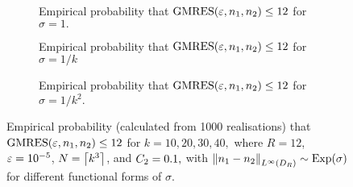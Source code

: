 


\begin{figure}[p]
  \centering
  \begin{subfigure}{\textwidth}
    \centering

\caption{Empirical probability that $\GMRES{\eps}{\no}{\nt}\leq 12$ for $\sigma = 1.$\label{fig:prob-plot-0.0}}
\end{subfigure}

\begin{subfigure}{\textwidth}
    \centering

\caption{Empirical probability that $\GMRES{\eps}{\no}{\nt}\leq 12$ for $\sigma = 1/k$\label{fig:prob-plot-1.0}}
\end{subfigure}

\begin{subfigure}{\textwidth}
    \centering

\caption{Empirical probability that $\GMRES{\eps}{\no}{\nt}\leq 12$ for $\sigma = 1/k^2.$\label{fig:prob-plot-2.0}}
\end{subfigure}
\caption{Empirical probability (calculated from 1000 realisations) that $\GMRES{\eps}{\no}{\nt}\leq 12$ for $k = 10, 20, 30, 40,$ where $R=12$, $\varepsilon = 10^{-5}$, $N = \ceil{k^{3}}$, and $C_{2}=0.1,$ with $\NLiDR{\no-\nt} \sim \Exp{\sigma}$ for different functional forms of $\sigma.$}
\end{figure}

